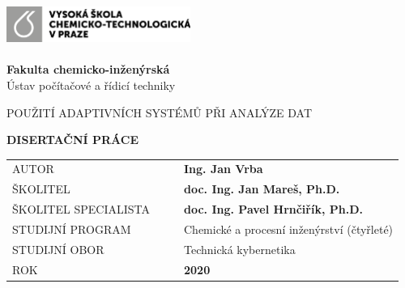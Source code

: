 \cleardoublepage
\thispagestyle{empty}
\noindent
\includegraphics[width=0.45\textwidth]{IMG/TOP/logoVSCHT_zakl_CB.png} \\
\vspace{10mm}
\\
{\Large \textbf{Fakulta  chemicko-inženýrská}
\\ [5mm]
Ústav počítačové a řídicí techniky}

\vspace{40mm}


\begin{spacing}{0.9}
\Huge\noindent POUŽITÍ ADAPTIVNÍCH SYSTÉMŮ PŘI ANALÝZE DAT\\ 
\end{spacing}
\vspace{30mm}

\noindent
{\Large \textbf{DISERTAČNÍ PRÁCE}} 

\vspace{15mm}

\begin{table}[!h]
\begin{tabular}{  l l |l  l }
\hspace{-0.5em}AUTOR & \hspace{0mm} & & {\Large \textbf{Ing. Jan Vrba}} \\ [7mm]
\hspace{-0.5em}ŠKOLITEL &  &  & \textbf{\large doc. Ing. Jan Mareš, Ph.D.}\\ [7mm]
\hspace{-0.5em}ŠKOLITEL  SPECIALISTA             &     &   & {\textbf{\large doc. Ing. Pavel Hrnčiřík, Ph.D. }} \\ [7mm]
\hspace{-0.5em}STUDIJNÍ PROGRAM &  &  & {\large Chemické a procesní inženýrství (čtyřleté)} \\ [7mm]
\hspace{-0.5em}STUDIJNÍ OBOR    & &   & {\large Technická kybernetika}\\ [7mm]
\hspace{-0.5em}ROK          &       &   & \textbf{2020} \\
\end{tabular}


\end{table}


